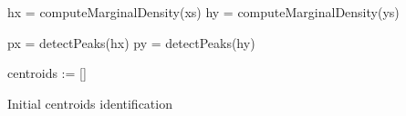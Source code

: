 \begin{algorithm}[h]

 hx = computeMarginalDensity(xs)\;
 hy = computeMarginalDensity(ys)\;

 px = detectPeaks(hx)\;
 py = detectPeaks(hy)\;

 centroids := []\;
 \label{alg:grid_creation}
 \caption{Initial centroids identification}
\end{algorithm}
